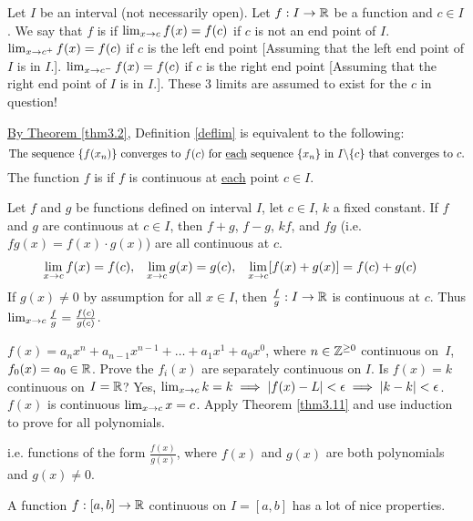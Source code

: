 \documentclass[]{article}
\begin{document}
\begin{definition}
	Let $I$ be an interval (not necessarily open). Let $f:I\rightarrow \mathbb{R}$ be a function and $c\in I$. We say that $f$ is  if $\lim_{x\rightarrow c} f(x) = f(c)$ if $c$ is not an end point of $I$.
	$\lim_{x\rightarrow c^+} f(x) = f(c)$ if $c$ is the left end point [Assuming that the left end point of $I$ is in $I$.]. 
	$\lim_{x\rightarrow c^-} f(x) = f(c)$ if $c$ is the right end point [Assuming that the right end point of $I$ is in $I$.]. 
	These 3 limits are assumed to exist for the $c$ in question!
	\label{deflim}
\end{definition}
\ul{By Theorem \ref{thm3.2}}, Definition \ref{deflim} is equivalent to the following: 
$$\text{The sequence $\{f(x_n)\}$ converges to $f(c)$ for \underline{each} sequence $\{x_n\}$ in $I\backslash\{c\}$ that converges to $c$.}$$
The function $f$ is  if $f$ is continuous at \ul{each} point $c\in I$.
\begin{theorem}
	Let $f$ and $g$ be functions defined on interval $I$, let $c\in I$, $k$ a fixed constant. If $f$ and $g$ are continuous at $c\in I$, then $f+g$, $f-g$, $kf$, and $fg$ (i.e. $fg(x)=f(x)\cdot g(x)$) are all continuous at $c$.
	\begin{align*}
		\lim_{x\rightarrow c} f(x) &= f(c), & \lim_{x\rightarrow c} g(x) &= g(c), & \lim_{x\rightarrow c} [f(x) + g(x)] &= f(c) + g(c)
	\end{align*}
	If \ul{$g(x)\neq 0$} by assumption for all $x\in I$, then $\frac{f}{g}:I\rightarrow \mathbb{R}$ is continuous at $c$.
	Thus $\lim_{x\rightarrow c} \frac{f}{g} = \frac{f(c)}{g(c)}$.
	\label{thm3.11}
\end{theorem}
\begin{example}
	[\ul{Polynomials}] $f(x) = a_nx^n + a_{n-1}x^{n-1} + \dots + a_1x^1 + a_0x^0$, where $n\in\mathbb{Z}^{\geq 0}$ continuous on~$I$, \ul{$f_0(x)=a_0\in \mathbb{R}$}. Prove the $f_i(x)$ are separately continuous on $I$. Is $f(x) = k$ continuous on $I = \mathbb{R}$? Yes, $\lim_{x\rightarrow c} k = k \implies |f(x)-L|<\epsilon \implies |k-k|<\epsilon$. \ul{$f(x)$} is continuous $\lim_{x\rightarrow c} x = c$. Apply Theorem \ref{thm3.11} and use induction to prove for all polynomials.
\end{example}
\begin{example}
	 i.e. functions of the form $\frac{f(x)}{g(x)}$, where $f(x)$ and $g(x)$ are both polynomials and $g(x) \neq 0$.
\end{example}
\begin{remark}
	A function $f:[a,b]\rightarrow \mathbb{R}$ continuous on $I = [a,b]$ has a lot of nice properties.
\end{remark}
\end{document}
